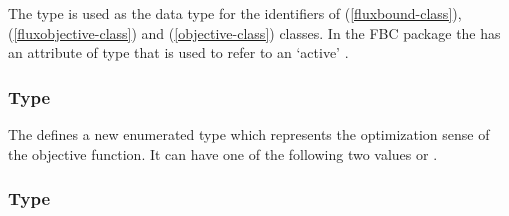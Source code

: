 The  type is used as the data type for the identifiers of \FluxBound
(\ref{fluxbound-class}), \FluxObjective (\ref{fluxobjective-class}) and \Objective
(\ref{objective-class}) classes. In the FBC package the \ListOfObjectives has an
attribute of type  that is used to refer to an `active' \Objective.

%

%

\subsubsection{Type }
\label{primtype-fbctype}

The \FBCPackage defines a new enumerated type  which
represents the optimization sense of the objective function. It can have one
of the following two values  or .

\subsubsection{Type }
\label{primtype-fbcoperation}

